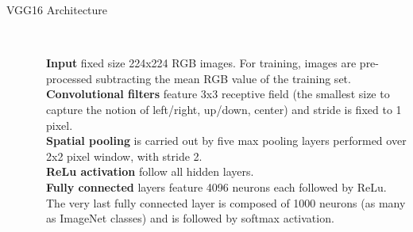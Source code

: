\documentclass[aspectratio=169]{beamer}
\begin{document}
\begin{frame}{VGG16 Architecture}
\begin{columns}
\begin{column}{0.1\textwidth}
\begin{figure}
\begin{tabular}{c}
			\end{tabular}
		\end{figure}
	\end{column}
	\begin{column}{0.9\textwidth}
		\\ \vspace{0.5cm}
		\textbf{Input} fixed size 224x224 RGB images. For training, images are pre-processed subtracting the mean RGB value of the training set.\\
		\vspace{0.25cm}
		\textbf{Convolutional filters} feature 3x3 receptive field (the smallest size to capture the notion of left/right, up/down, center) and stride is fixed to 1 pixel.\\
		\vspace{0.25cm}
		\textbf{Spatial pooling} is carried out by five max pooling layers performed over 2x2 pixel window, with stride 2.\\
		\vspace{0.25cm}
		\textbf{ReLu activation} follow all hidden layers.\\
		\vspace{0.25cm}
		\textbf{Fully connected} layers feature 4096 neurons each followed by ReLu. The very last fully connected layer is composed of 1000 neurons (as many as ImageNet classes) and is followed by softmax activation.
	\end{column}
\end{columns}
\end{frame}

\end{document}
